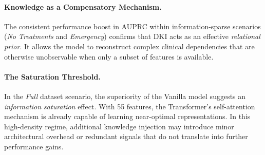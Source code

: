 \paragraph{Knowledge as a Compensatory Mechanism.}
The consistent performance boost in AUPRC within information-sparse scenarios (\textit{No Treatments} and \textit{Emergency}) confirms that DKI acts as an effective \textit{relational prior}. It allows the model to reconstruct complex clinical dependencies that are otherwise unobservable when only a subset of features is available.

\paragraph{The Saturation Threshold.}
In the \textit{Full} dataset scenario, the superiority of the Vanilla model suggests an \textit{information saturation} effect. With 55 features, the Transformer's self-attention mechanism is already capable of learning near-optimal representations. In this high-density regime, additional knowledge injection may introduce minor architectural overhead or redundant signals that do not translate into further performance gains.
